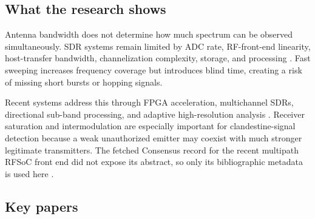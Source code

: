 \documentclass[
  10pt,
]{article}
\begin{document}
\subsection{What the research shows}\label{what-the-research-shows-4}

Antenna bandwidth does not determine how much spectrum can be observed
simultaneously. SDR systems remain limited by ADC rate, RF-front-end
linearity, host-transfer bandwidth, channelization complexity, storage,
and processing \citep{flak2022, subbaraman2022}. Fast sweeping increases
frequency coverage but introduces blind time, creating a risk of missing
short bursts or hopping signals.

Recent systems address this through FPGA acceleration, multichannel
SDRs, directional sub-band processing, and adaptive high-resolution
analysis \citep{gharat2026, madanayake2024, sorecau2026}. Receiver
saturation and intermodulation are especially important for
clandestine-signal detection because a weak unauthorized emitter may
coexist with much stronger legitimate transmitters. The fetched
Consensus record for the recent multipath RFSoC front end did not expose
its abstract, so only its bibliographic metadata is used here
\citep{kovacs2025}.

\subsection{Key papers}\label{key-papers-4}
\end{document}
